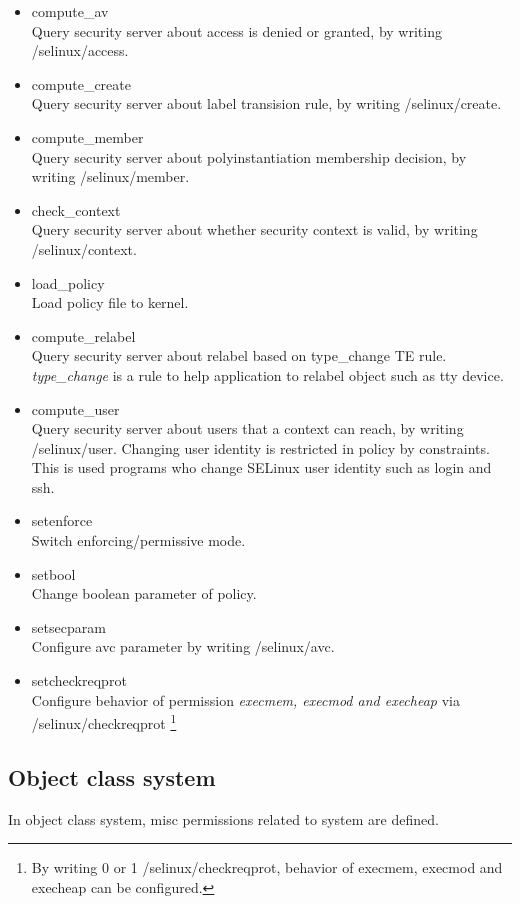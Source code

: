 \documentclass{article}
\begin{document}
\begin{itemize}
 \item  compute\_av\\
	Query security server about access is denied or granted, by writing /selinux/access.
 \item  compute\_create\\
	Query security server about label transision rule, by writing /selinux/create. 
 \item  compute\_member\\
	Query security server about polyinstantiation\cite{polyinstantation} membership decision, by writing /selinux/member.
	
 \item  check\_context\\
	Query security server about whether security context is valid,
	by writing /selinux/context.
 \item  load\_policy\\
	Load policy file to kernel.
 \item compute\_relabel\\
	Query security server about relabel based on type\_change
	TE rule. {\it type\_change} is a rule to help application to relabel
	object such as tty device.
 \item	compute\_user\\
	Query security server about users that a context can
	reach, by writing /selinux/user. Changing user identity is
	restricted in policy by constraints. 
	This is used programs who change SELinux user identity
	such as login and ssh.
 \item setenforce\\    
	Switch enforcing/permissive mode.
 \item  setbool\\
	Change boolean parameter of policy.
 \item  setsecparam\\
	Configure avc parameter by writing /selinux/avc.
 \item  setcheckreqprot\\
	Configure behavior of permission {\it execmem, execmod and
	execheap} via /selinux/checkreqprot \footnote{By writing 0 or 1
	/selinux/checkreqprot, behavior of execmem, execmod and
       execheap can be configured.}
\end{itemize}

\subsection{Object class system}
In object class system, misc permissions related to system are
defined.
\end{document}
